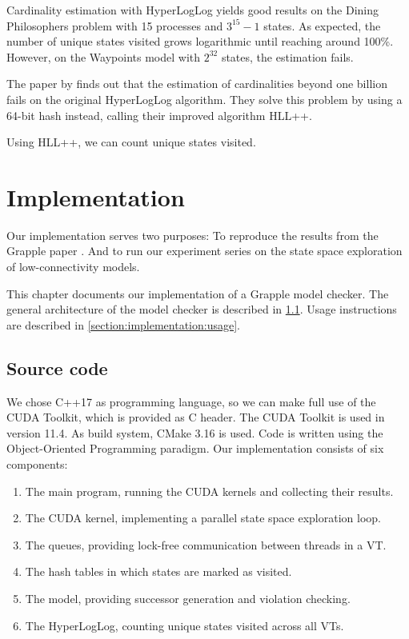 \documentclass[
fancyheadings, %
%
%
]{stsreprt}
\newcommand{\citeinline}[1]{\citetitle{#1} by \citeauthor*{#1} \cite{#1}}
\begin{document}
Cardinality estimation with HyperLogLog yields good results on the Dining Philosophers problem with 15 processes and $3^{15}-1$ states.
As expected, the number of unique states visited grows logarithmic until reaching around 100\%.
However, on the Waypoints model with $2^{32}$ states, the estimation fails.

The paper \citeinline{Heule2013.HyperLogLog++} finds out that the estimation of cardinalities beyond one billion fails on the original HyperLogLog algorithm.
They solve this problem by using a 64-bit hash instead, calling their improved algorithm HLL++.

Using HLL++, we can count unique states visited.

\chapter{Implementation}

Our implementation serves two purposes:
To reproduce the results from the Grapple paper \cite{DeFrancisco2020.Grapple}.
And to run our experiment series on the state space exploration of low-connectivity models.

This chapter documents our implementation of a Grapple model checker.
The general architecture of the model checker is described in \cref{section:implementation:source-code}.
Usage instructions are described in \cref{section:implementation:usage}.

\section{Source code}
\label{section:implementation:source-code}

We chose C++17 as programming language, so we can make full use of the CUDA Toolkit, which is provided as C header.
The CUDA Toolkit is used in version 11.4.
As build system, CMake 3.16 is used.
Code is written using the Object-Oriented Programming paradigm.
Our implementation consists of six components:

\begin{enumerate}
    \item The main program, running the CUDA kernels and collecting their results.
    \item The CUDA kernel, implementing a parallel state space exploration loop.
    \item The queues, providing lock-free communication between threads in a VT.
    \item The hash tables in which states are marked as visited.
    \item The model, providing successor generation and violation checking.
    \item The HyperLogLog, counting unique states visited across all VTs.
\end{enumerate}
\end{document}
